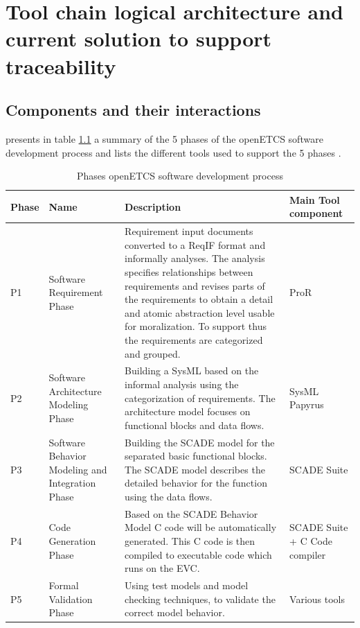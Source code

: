 \documentclass[11pt]{template/openetcs_report}
\begin{document}
\chapter{Tool chain logical architecture and current solution to support traceability}
\section{Components and their interactions}

\label{sec-4-1} 

\cite{qa-plan} presents in table \ref{tab:DevelopmentPhases} a summary of the 5 phases of the openETCS software development process and lists the different tools used to support the 5 phases . 

\begin{table}[h]
  \centering 
  \caption{Phases openETCS software development process}
\begin{tabular}{|p{1cm}|p{2.5cm}|p{8.5cm}|p{2cm}|}
\hline \textbf{Phase} & \textbf{Name} & \textbf{Description} & \textbf{Main Tool component} \\ 
\hline P1 & Software Requirement Phase & Requirement input documents converted to a ReqIF format and informally analyses. The analysis specifies relationships between requirements and revises parts of the requirements to obtain a detail and atomic abstraction level usable for moralization. To support thus the requirements are categorized and grouped. & ProR \\ 
\hline P2 & Software Architecture Modeling Phase & Building a SysML based on the informal analysis using the categorization of requirements. The architecture model focuses on functional blocks and data flows. & SysML Papyrus \\ 
\hline P3 & Software Behavior Modeling and Integration Phase & Building the SCADE model for the separated basic functional blocks. The SCADE model describes the detailed behavior for the function using the data flows. & SCADE Suite \\ 
\hline P4 & Code Generation Phase & Based on the SCADE Behavior Model C code will be automatically generated. This C code is then compiled to executable code which runs on the EVC. & SCADE Suite + C Code compiler\\
\hline P5 & Formal Validation Phase & Using test models and model checking techniques, to validate the correct model behavior.  & Various tools \\ 
\hline 
\end{tabular} 
\label{tab:DevelopmentPhases}
\end{table}
\end{document}
